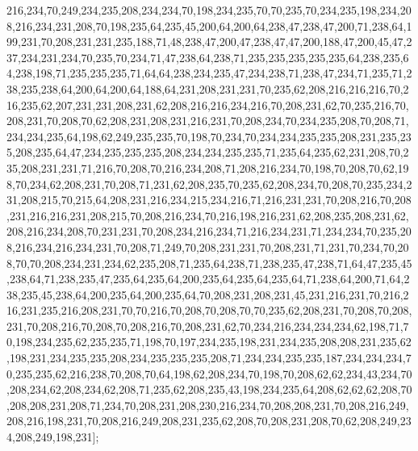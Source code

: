 216,234,70,249,234,235,208,234,234,70,198,234,235,70,70,235,70,234,235,198,234,208,216,234,231,208,70,198,235,64,235,45,200,64,200,64,238,47,238,47,200,71,238,64,199,231,70,208,231,231,235,188,71,48,238,47,200,47,238,47,47,200,188,47,200,45,47,237,234,231,234,70,235,70,234,71,47,238,64,238,71,235,235,235,235,235,64,238,235,64,238,198,71,235,235,235,71,64,64,238,234,235,47,234,238,71,238,47,234,71,235,71,238,235,238,64,200,64,200,64,188,64,231,208,231,231,70,235,62,208,216,216,216,70,216,235,62,207,231,231,208,231,62,208,216,216,234,216,70,208,231,62,70,235,216,70,208,231,70,208,70,62,208,231,208,231,216,231,70,208,234,70,234,235,208,70,208,71,234,234,235,64,198,62,249,235,235,70,198,70,234,70,234,234,235,235,208,231,235,235,208,235,64,47,234,235,235,235,208,234,234,235,235,71,235,64,235,62,231,208,70,235,208,231,231,71,216,70,208,70,216,234,208,71,208,216,234,70,198,70,208,70,62,198,70,234,62,208,231,70,208,71,231,62,208,235,70,235,62,208,234,70,208,70,235,234,231,208,215,70,215,64,208,231,216,234,215,234,216,71,216,231,231,70,208,216,70,208,231,216,216,231,208,215,70,208,216,234,70,216,198,216,231,62,208,235,208,231,62,208,216,234,208,70,231,231,70,208,234,216,234,71,216,234,231,71,234,234,70,235,208,216,234,216,234,231,70,208,71,249,70,208,231,231,70,208,231,71,231,70,234,70,208,70,70,208,234,231,234,62,235,208,71,235,64,238,71,238,235,47,238,71,64,47,235,45,238,64,71,238,235,47,235,64,235,64,200,235,64,235,64,235,64,71,238,64,200,71,64,238,235,45,238,64,200,235,64,200,235,64,70,208,231,208,231,45,231,216,231,70,216,216,231,235,216,208,231,70,70,216,70,208,70,208,70,70,235,62,208,231,70,208,70,208,231,70,208,216,70,208,70,208,216,70,208,231,62,70,234,216,234,234,234,62,198,71,70,198,234,235,62,235,235,71,198,70,197,234,235,198,231,234,235,208,208,231,235,62,198,231,234,235,235,208,234,235,235,235,208,71,234,234,235,235,187,234,234,234,70,235,235,62,216,238,70,208,70,64,198,62,208,234,70,198,70,208,62,62,234,43,234,70,208,234,62,208,234,62,208,71,235,62,208,235,43,198,234,235,64,208,62,62,62,208,70,208,208,231,208,71,234,70,208,231,208,230,216,234,70,208,208,231,70,208,216,249,208,216,198,231,70,208,216,249,208,231,235,62,208,70,208,231,208,70,62,208,249,234,208,249,198,231];

